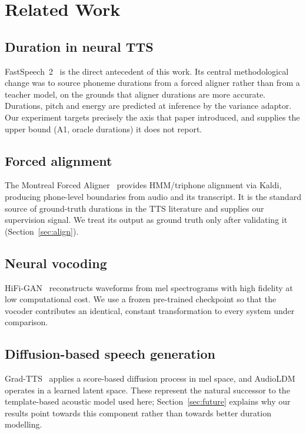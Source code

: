 \documentclass[conference]{IEEEtran}
\begin{document}
\section{Related Work}

\subsection{Duration in neural TTS}
FastSpeech~2~\cite{ren2021fastspeech2} is the direct antecedent of this work. Its central
methodological change was to source phoneme durations from a forced aligner rather than from a
teacher model, on the grounds that aligner durations are more accurate. Durations, pitch and
energy are predicted at inference by the variance adaptor. Our experiment targets precisely the
axis that paper introduced, and supplies the upper bound (A1, oracle durations) it does not report.

\subsection{Forced alignment}
The Montreal Forced Aligner~\cite{mcauliffe2017mfa} provides HMM/triphone alignment via Kaldi,
producing phone-level boundaries from audio and its transcript. It is the standard source of
ground-truth durations in the TTS literature and supplies our supervision signal. We treat its
output as ground truth only after validating it (Section~\ref{sec:align}).

\subsection{Neural vocoding}
HiFi-GAN~\cite{kong2020hifigan} reconstructs waveforms from mel spectrograms with high fidelity at
low computational cost. We use a frozen pre-trained checkpoint so that the vocoder contributes an
identical, constant transformation to every system under comparison.

\subsection{Diffusion-based speech generation}
Grad-TTS~\cite{popov2021gradtts} applies a score-based diffusion process in mel space, and
AudioLDM~\cite{liu2023audioldm} operates in a learned latent space. These represent the natural
successor to the template-based acoustic model used here; Section~\ref{sec:future} explains why
our results point towards this component rather than towards better duration modelling.
\end{document}
